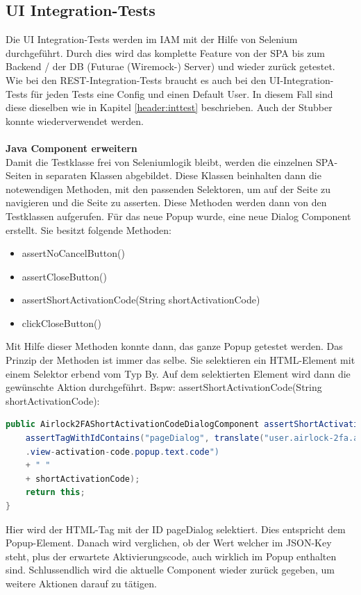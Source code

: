 \subsection{UI Integration-Tests}
Die UI Integration-Tests werden im IAM mit der Hilfe von Selenium durchgeführt. Durch dies wird das komplette Feature von der SPA bis zum Backend / der DB (Futurae (Wiremock-) Server) und wieder zurück getestet. \\
Wie bei den REST-Integration-Tests braucht es auch bei den UI-Integration-Tests für jeden Tests eine Config und einen Default User. In diesem Fall sind diese dieselben wie in Kapitel \ref{header:inttest} beschrieben. Auch der Stubber konnte wiederverwendet werden. 
\\
\\
\textbf{Java Component erweitern}\\
Damit die Testklasse frei von Seleniumlogik bleibt, werden die einzelnen SPA-Seiten in separaten Klassen abgebildet. Diese Klassen beinhalten dann die notewendigen Methoden, mit den passenden Selektoren, um auf der Seite zu navigieren und die Seite zu asserten. Diese Methoden werden dann von den Testklassen aufgerufen. Für das neue Popup wurde, eine neue Dialog Component erstellt. Sie besitzt folgende Methoden:
\begin{itemize}
	\item assertNoCancelButton()
	\item assertCloseButton()
	\item assertShortActivationCode(String shortActivationCode)
	\item clickCloseButton()
\end{itemize}
Mit Hilfe dieser Methoden konnte dann, das ganze Popup getestet werden. Das Prinzip der Methoden ist immer das selbe. Sie selektieren ein HTML-Element mit einem Selektor erbend vom Typ \flqq By\frqq{}. Auf dem selektierten Element wird dann die gewünschte Aktion durchgeführt. Bspw: assertShortActivationCode(String shortActivationCode):
\begin{lstlisting}[language=Java]
public Airlock2FAShortActivationCodeDialogComponent assertShortActivationCode (String shortActivationCode) {
	assertTagWithIdContains("pageDialog", translate("user.airlock-2fa.activation
	.view-activation-code.popup.text.code") 
	+ " " 
	+ shortActivationCode);
	return this;
}
\end{lstlisting}
Hier wird der HTML-Tag mit der ID \flqq pageDialog\frqq{} selektiert. Dies entspricht dem Popup-Element. Danach wird verglichen, ob der Wert welcher im JSON-Key steht, plus der erwartete Aktivierungscode, auch wirklich im Popup enthalten sind. Schlussendlich wird die aktuelle Component wieder zurück gegeben, um weitere Aktionen darauf zu tätigen.
